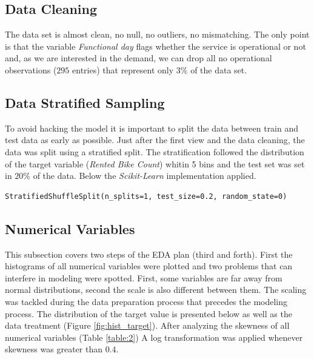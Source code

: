 \documentclass[11pt, a4]{article}
\begin{document}
\subsection*{Data Cleaning}

The data set is almost clean, no null, no outliers, no mismatching. The only point is that the variable \textit{Functional day} flags whether the service is operational or not and, as we are interested in the demand, we can drop all no operational observations ($295$ entries) that represent only $3\%$ of the data set.

\subsection*{Data Stratified Sampling}

To avoid hacking the model it is important to split the data between train and test data as early as possible. Just after the first view and the data cleaning, the data was split using a stratified split. The stratification followed the distribution of the target variable (\textit{Rented Bike Count}) whitin 5 bins and the test set was set in $20\%$ of the data. Below the \textit{Scikit-Learn} implementation applied.

\begin{lstlisting}
StratifiedShuffleSplit(n_splits=1, test_size=0.2, random_state=0)
\end{lstlisting}

\subsection*{Numerical Variables}

This subsection covers two steps of the EDA plan (third and forth). First the histograms of all numerical variables were plotted and two problems that can interfere in modeling were spotted. First, some variables are far away from normal distributions, second the scale is also different between them. The scaling was tackled during the data preparation process that precedes the modeling process. The distribution of the target value is presented below as well as the data treatment (Figure \ref{fig:hist_target}). After analyzing the skewness of all numerical variables (Table \ref{table:2}) A log transformation was applied whenever skewness was greater than $0.4$. 
\end{document}
